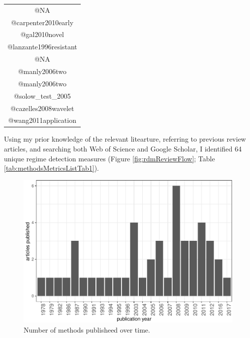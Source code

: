 \documentclass[12pt,twoside,openany]{reedthesis}
\begin{document}
\begin{longtable}[]{@{}c@{}}
\begin{minipage}[t]{0.44\columnwidth}
@NA\strut
\end{minipage}\tabularnewline
\begin{minipage}[t]{0.44\columnwidth}\centering\strut
@carpenter2010early\strut
\end{minipage}\tabularnewline
\begin{minipage}[t]{0.44\columnwidth}\centering\strut
@gal2010novel\strut
\end{minipage}\tabularnewline
\begin{minipage}[t]{0.44\columnwidth}\centering\strut
@lanzante1996resistant\strut
\end{minipage}\tabularnewline
\begin{minipage}[t]{0.44\columnwidth}\centering\strut
@NA\strut
\end{minipage}\tabularnewline
\begin{minipage}[t]{0.44\columnwidth}\centering\strut
@manly2006two\strut
\end{minipage}\tabularnewline
\begin{minipage}[t]{0.44\columnwidth}\centering\strut
@manly2006two\strut
\end{minipage}\tabularnewline
\begin{minipage}[t]{0.44\columnwidth}\centering\strut
@solow\_test\_2005\strut
\end{minipage}\tabularnewline
\begin{minipage}[t]{0.44\columnwidth}\centering\strut
@cazelles2008wavelet\strut
\end{minipage}\tabularnewline
\begin{minipage}[t]{0.44\columnwidth}\centering\strut
@wang2011application\strut
\end{minipage}\tabularnewline
\bottomrule
\end{longtable}
Using my prior knowledge of the relevant litearture, referring to
previous review articles, and searching both Web of Science and Google
Scholar, I identified 64 unique regime detection measures (Figure
\ref{fig:rdmReviewFlow}; Table \ref{tab:methodsMetricsListTab1}).
\begin{figure}
\centering
\includegraphics{_myDissertation_files/figure-latex/jrnlYearFig-1.pdf}
\caption{\label{fig:jrnlYearFig}Number of methods publisheed over time.}
\end{figure}
\end{document}
